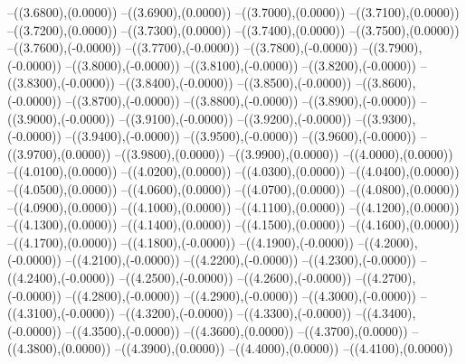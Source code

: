 {	--({\sx*(3.6800)},{\sy*(0.0000)})
	--({\sx*(3.6900)},{\sy*(0.0000)})
	--({\sx*(3.7000)},{\sy*(0.0000)})
	--({\sx*(3.7100)},{\sy*(0.0000)})
	--({\sx*(3.7200)},{\sy*(0.0000)})
	--({\sx*(3.7300)},{\sy*(0.0000)})
	--({\sx*(3.7400)},{\sy*(0.0000)})
	--({\sx*(3.7500)},{\sy*(0.0000)})
	--({\sx*(3.7600)},{\sy*(-0.0000)})
	--({\sx*(3.7700)},{\sy*(-0.0000)})
	--({\sx*(3.7800)},{\sy*(-0.0000)})
	--({\sx*(3.7900)},{\sy*(-0.0000)})
	--({\sx*(3.8000)},{\sy*(-0.0000)})
	--({\sx*(3.8100)},{\sy*(-0.0000)})
	--({\sx*(3.8200)},{\sy*(-0.0000)})
	--({\sx*(3.8300)},{\sy*(-0.0000)})
	--({\sx*(3.8400)},{\sy*(-0.0000)})
	--({\sx*(3.8500)},{\sy*(-0.0000)})
	--({\sx*(3.8600)},{\sy*(-0.0000)})
	--({\sx*(3.8700)},{\sy*(-0.0000)})
	--({\sx*(3.8800)},{\sy*(-0.0000)})
	--({\sx*(3.8900)},{\sy*(-0.0000)})
	--({\sx*(3.9000)},{\sy*(-0.0000)})
	--({\sx*(3.9100)},{\sy*(-0.0000)})
	--({\sx*(3.9200)},{\sy*(-0.0000)})
	--({\sx*(3.9300)},{\sy*(-0.0000)})
	--({\sx*(3.9400)},{\sy*(-0.0000)})
	--({\sx*(3.9500)},{\sy*(-0.0000)})
	--({\sx*(3.9600)},{\sy*(-0.0000)})
	--({\sx*(3.9700)},{\sy*(0.0000)})
	--({\sx*(3.9800)},{\sy*(0.0000)})
	--({\sx*(3.9900)},{\sy*(0.0000)})
	--({\sx*(4.0000)},{\sy*(0.0000)})
	--({\sx*(4.0100)},{\sy*(0.0000)})
	--({\sx*(4.0200)},{\sy*(0.0000)})
	--({\sx*(4.0300)},{\sy*(0.0000)})
	--({\sx*(4.0400)},{\sy*(0.0000)})
	--({\sx*(4.0500)},{\sy*(0.0000)})
	--({\sx*(4.0600)},{\sy*(0.0000)})
	--({\sx*(4.0700)},{\sy*(0.0000)})
	--({\sx*(4.0800)},{\sy*(0.0000)})
	--({\sx*(4.0900)},{\sy*(0.0000)})
	--({\sx*(4.1000)},{\sy*(0.0000)})
	--({\sx*(4.1100)},{\sy*(0.0000)})
	--({\sx*(4.1200)},{\sy*(0.0000)})
	--({\sx*(4.1300)},{\sy*(0.0000)})
	--({\sx*(4.1400)},{\sy*(0.0000)})
	--({\sx*(4.1500)},{\sy*(0.0000)})
	--({\sx*(4.1600)},{\sy*(0.0000)})
	--({\sx*(4.1700)},{\sy*(0.0000)})
	--({\sx*(4.1800)},{\sy*(-0.0000)})
	--({\sx*(4.1900)},{\sy*(-0.0000)})
	--({\sx*(4.2000)},{\sy*(-0.0000)})
	--({\sx*(4.2100)},{\sy*(-0.0000)})
	--({\sx*(4.2200)},{\sy*(-0.0000)})
	--({\sx*(4.2300)},{\sy*(-0.0000)})
	--({\sx*(4.2400)},{\sy*(-0.0000)})
	--({\sx*(4.2500)},{\sy*(-0.0000)})
	--({\sx*(4.2600)},{\sy*(-0.0000)})
	--({\sx*(4.2700)},{\sy*(-0.0000)})
	--({\sx*(4.2800)},{\sy*(-0.0000)})
	--({\sx*(4.2900)},{\sy*(-0.0000)})
	--({\sx*(4.3000)},{\sy*(-0.0000)})
	--({\sx*(4.3100)},{\sy*(-0.0000)})
	--({\sx*(4.3200)},{\sy*(-0.0000)})
	--({\sx*(4.3300)},{\sy*(-0.0000)})
	--({\sx*(4.3400)},{\sy*(-0.0000)})
	--({\sx*(4.3500)},{\sy*(-0.0000)})
	--({\sx*(4.3600)},{\sy*(0.0000)})
	--({\sx*(4.3700)},{\sy*(0.0000)})
	--({\sx*(4.3800)},{\sy*(0.0000)})
	--({\sx*(4.3900)},{\sy*(0.0000)})
	--({\sx*(4.4000)},{\sy*(0.0000)})
	--({\sx*(4.4100)},{\sy*(0.0000)})
}
